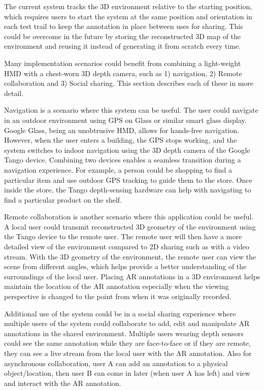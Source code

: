 The current system tracks the 3D environment relative to the starting position, which requires users to start the system at the same position and orientation in each test trail to keep the annotation in place between uses for sharing. This could be overcome in the future by storing the reconstructed 3D map of the environment and reusing it instead of generating it from scratch every time. 

Many implementation scenarios could benefit from combining a light-weight HMD with a chest-worn 3D depth camera, such as 1) navigation, 2) Remote collaboration and 3) Social sharing. This section describes each of these in more detail.

Navigation is a scenario where this system can be useful. The user could navigate in an outdoor environment using GPS on Glass or similar smart glass display. Google Glass, being an unobtrusive HMD, allows for hands-free navigation. However, when the user enters a building, the GPS stops working, and the system switches to indoor navigation using the 3D depth camera of the Google Tango device. Combining two devices enables a seamless transition during a navigation experience. For example, a person could be shopping to find a particular item and use outdoor GPS tracking to guide them to the store. Once inside the store, the Tango depth-sensing hardware can help with navigating to find a particular product on the shelf.

Remote collaboration is another scenario where this application could be useful. A local user could transmit reconstructed 3D geometry of the environment using the Tango device to the remote user. The remote user will then have a more detailed view of the environment compared to 2D sharing such as with a video stream. With the 3D geometry of the environment, the remote user can view the scene from different angles, which helps provide a better understanding of the surroundings of the local user. Placing AR annotations in a 3D environment helps maintain the location of the AR annotation especially when the viewing perspective is changed to the point from when it was originally recorded.

Additional use of the system could be in a social sharing experience where multiple users of the system could collaborate to add, edit and manipulate AR annotations in the shared environment. Multiple users wearing depth sensors could see the same annotation while they are face-to-face or if they are remote, they can see a live stream from the local user with the AR annotation. Also for asynchronous collaboration, user A can add an annotation to a physical object/location, then user B can come in later (when user A has left) and view and interact with the AR annotation.

